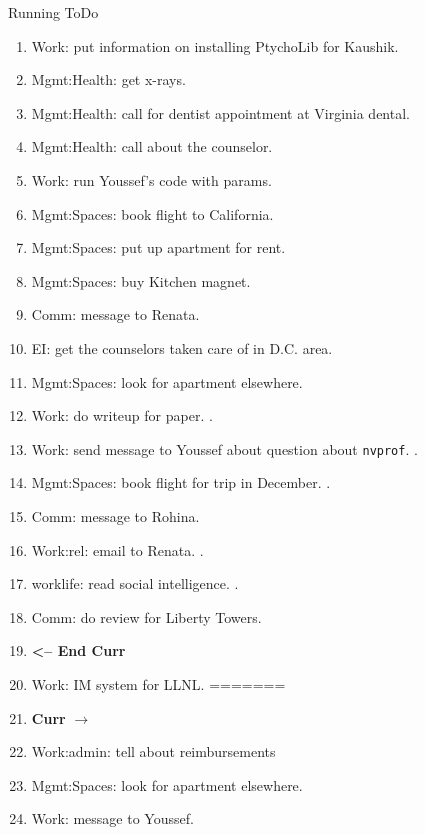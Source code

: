 \begin{columns}
\begin{column}{0.6\linewidth}
\begin{block}{Running ToDo}
\begin{enumerate}
     \item \tiny Work: put information on installing PtychoLib for Kaushik. 
     \item \tiny Mgmt:Health: get x-rays. 
     \item \tiny Mgmt:Health: call for dentist appointment at Virginia
       dental.
     \item \tiny Mgmt:Health: call about the counselor. 
     \item \tiny Work: run Youssef’s code with params.
     \item \tiny Mgmt:Spaces: book flight to California.
     \item \tiny Mgmt:Spaces: put up apartment for rent.
     \item \tiny Mgmt:Spaces: buy Kitchen magnet.
     \item \tiny Comm: message to Renata.
     \item \tiny EI: get the counselors taken care of in D.C. area. 
     \item \tiny Mgmt:Spaces: look for apartment elsewhere. 
     \item \tiny Work: do writeup for paper. . 
     \item \tiny Work: send message to Youssef about question about
       \texttt{nvprof}. .
     \item \tiny Mgmt:Spaces: book flight for trip in December. .
     \item \tiny Comm: message to Rohina. 
     \item \tiny Work:rel: email to Renata. . 
     \item \tiny worklife: read social intelligence. . 
     \item \tiny Comm: do review for Liberty Towers.
     \item \tiny \textbf{ <-- End Curr } 

     \item \tiny Work: IM system for LLNL.
=======



        \tiny \item \tiny \textbf{Curr} $\rightarrow$ 
        \item \tiny Work:admin: tell about reimbursements 
        \item \tiny  Mgmt:Spaces: look for apartment elsewhere. 

        \item \tiny Work: message to Youssef.   


\end{enumerate}
\end{block}
\end{column}
\end{columns}
